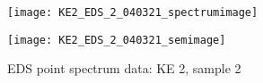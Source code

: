 \begin{figure}[H]
\centering
\begin{minipage}{.45\textwidth}
  \centering
  \texttt{[image: KE2\_EDS\_2\_040321\_spectrumimage]}
\end{minipage}
\begin{minipage}{.45\textwidth}
  \centering
  \texttt{[image: KE2\_EDS\_2\_040321\_semimage]}
\end{minipage}
\caption[EDS point spectrum data: KE 2, sample 2]{EDS point spectrum data: KE 2, sample 2}
\label{fig:ke2_point_eds_2}
\end{figure}



